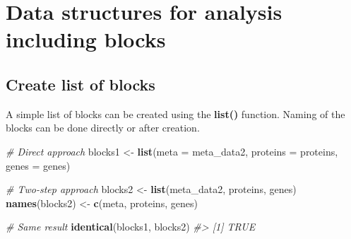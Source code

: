 \documentclass[
]{article}
\newenvironment{Shaded}{\begin{snugshade}}{\end{snugshade}}
\newcommand{\AttributeTok}[1]{\textcolor[rgb]{0.13,0.29,0.53}{#1}}
\newcommand{\CommentTok}[1]{\textcolor[rgb]{0.56,0.35,0.01}{\textit{#1}}}
\newcommand{\FunctionTok}[1]{\textcolor[rgb]{0.13,0.29,0.53}{\textbf{#1}}}
\newcommand{\NormalTok}[1]{#1}
\newcommand{\OtherTok}[1]{\textcolor[rgb]{0.56,0.35,0.01}{#1}}
\newcommand{\StringTok}[1]{\textcolor[rgb]{0.31,0.60,0.02}{#1}}
\begin{document}
\hypertarget{data-structures-for-analysis-including-blocks}{%
\section{Data structures for analysis including
blocks}\label{data-structures-for-analysis-including-blocks}}

\hypertarget{create-list-of-blocks}{%
\subsection{Create list of blocks}\label{create-list-of-blocks}}

A simple list of blocks can be created using the \textbf{list()}
function. Naming of the blocks can be done directly or after creation.

\begin{Shaded}
\begin{Highlighting}[]
\CommentTok{\# Direct approach}
\NormalTok{blocks1 }\OtherTok{\textless{}{-}} \FunctionTok{list}\NormalTok{(}\AttributeTok{meta =}\NormalTok{ meta\_data2, }\AttributeTok{proteins =}\NormalTok{ proteins, }\AttributeTok{genes =}\NormalTok{ genes)}

\CommentTok{\# Two{-}step approach}
\NormalTok{blocks2 }\OtherTok{\textless{}{-}} \FunctionTok{list}\NormalTok{(meta\_data2, proteins, genes)}
\FunctionTok{names}\NormalTok{(blocks2) }\OtherTok{\textless{}{-}} \FunctionTok{c}\NormalTok{(}\StringTok{\textquotesingle{}meta\textquotesingle{}}\NormalTok{, }\StringTok{\textquotesingle{}proteins\textquotesingle{}}\NormalTok{, }\StringTok{\textquotesingle{}genes\textquotesingle{}}\NormalTok{)}

\CommentTok{\# Same result}
\FunctionTok{identical}\NormalTok{(blocks1, blocks2)}
\CommentTok{\#\textgreater{} [1] TRUE}


\end{Highlighting}
\end{Shaded}
\end{document}
